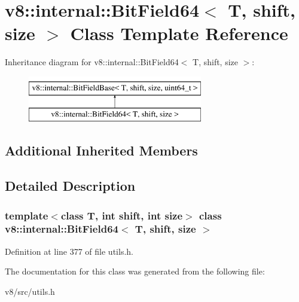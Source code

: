 \hypertarget{classv8_1_1internal_1_1BitField64}{}\section{v8\+:\+:internal\+:\+:Bit\+Field64$<$ T, shift, size $>$ Class Template Reference}
\label{classv8_1_1internal_1_1BitField64}
Inheritance diagram for v8\+:\+:internal\+:\+:Bit\+Field64$<$ T, shift, size $>$\+:\begin{figure}[H]
\begin{center}
\leavevmode
\includegraphics[height=2.000000cm]{classv8_1_1internal_1_1BitField64}
\end{center}
\end{figure}
\subsection*{Additional Inherited Members}


\subsection{Detailed Description}
\subsubsection*{template$<$class T, int shift, int size$>$\newline
class v8\+::internal\+::\+Bit\+Field64$<$ T, shift, size $>$}



Definition at line 377 of file utils.\+h.



The documentation for this class was generated from the following file\+:\begin{DoxyCompactItemize}
\item 
v8/src/utils.\+h\end{DoxyCompactItemize}
